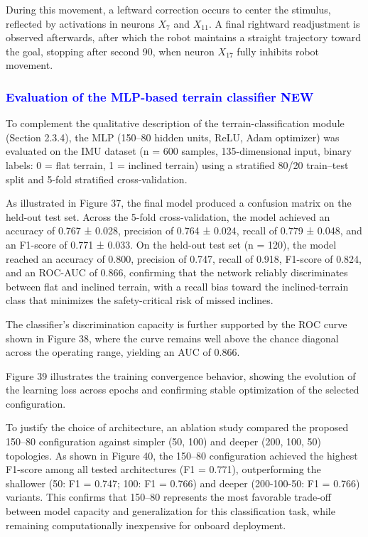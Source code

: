 \documentclass[preprint,12pt]{elsarticle}
\newcommand{\revblue}[1]{\textcolor{blue}{#1}}
\begin{document}
During this movement, a leftward correction occurs to center the stimulus, reflected by activations in neurons $X_7$ and $X_{11}$. A final rightward readjustment is observed afterwards, after which the robot maintains a straight trajectory toward the goal, stopping after second 90, when neuron $X_{17}$ fully inhibits robot movement. 

\subsubsection{\revblue{Evaluation of the MLP-based terrain classifier NEW}}

To complement the qualitative description of the terrain-classification module (Section 2.3.4), the MLP (150–80 hidden units, ReLU, Adam optimizer) was evaluated on the IMU dataset (n = 600 samples, 135-dimensional input, binary labels: 0 = flat terrain, 1 = inclined terrain) using a stratified 80/20 train–test split and 5-fold stratified cross-validation.

As illustrated in Figure 37, the final model produced a confusion matrix on the held-out test set. Across the 5-fold cross-validation, the model achieved an accuracy of 0.767 ± 0.028, precision of 0.764 ± 0.024, recall of 0.779 ± 0.048, and an F1-score of 0.771 ± 0.033. On the held-out test set (n = 120), the model reached an accuracy of 0.800, precision of 0.747, recall of 0.918, F1-score of 0.824, and an ROC-AUC of 0.866, confirming that the network reliably discriminates between flat and inclined terrain, with a recall bias toward the inclined-terrain class that minimizes the safety-critical risk of missed inclines.

The classifier's discrimination capacity is further supported by the ROC curve shown in Figure 38, where the curve remains well above the chance diagonal across the operating range, yielding an AUC of 0.866.

Figure 39 illustrates the training convergence behavior, showing the evolution of the learning loss across epochs and confirming stable optimization of the selected configuration.

To justify the choice of architecture, an ablation study compared the proposed 150–80 configuration against simpler (50, 100) and deeper (200, 100, 50) topologies. As shown in Figure 40, the 150–80 configuration achieved the highest F1-score among all tested architectures (F1 = 0.771), outperforming the shallower (50: F1 = 0.747; 100: F1 = 0.766) and deeper (200-100-50: F1 = 0.766) variants. This confirms that 150–80 represents the most favorable trade-off between model capacity and generalization for this classification task, while remaining computationally inexpensive for onboard deployment.
\end{document}
